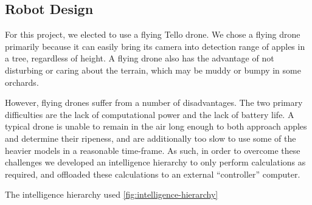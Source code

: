 \subsection{Robot Design}\label{subsec:robot-design}
For this project, we elected to use a flying Tello drone.
We chose a flying drone primarily because it can easily bring its camera into detection range of apples in a tree, regardless of height.
A flying drone also has the advantage of not disturbing or caring about the terrain, which may be muddy or bumpy in some orchards.

However, flying drones suffer from a number of disadvantages.
The two primary difficulties are the lack of computational power and the lack of battery life.
A typical drone is unable to remain in the air long enough to both approach apples and determine their ripeness, and are  additionally too slow to use some of the heavier models in a reasonable time-frame.
As such, in order to overcome these challenges we developed an intelligence hierarchy to only perform calculations as required, and offloaded these calculations to an external ``controller'' computer.

The intelligence hierarchy used \autoref{fig:intelligence-hierarchy}


